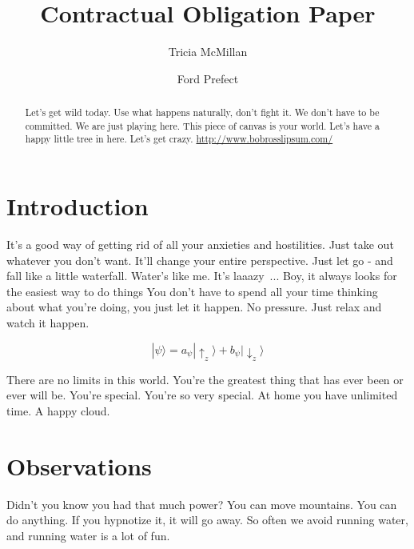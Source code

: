 \documentclass[twocolumn]{aastex63}
\begin{document}
\title{Contractual Obligation Paper}


\author{Tricia McMillan}

\author{Ford Prefect}

\begin{abstract}

Let's get wild today. Use what happens naturally, don't fight it. We
don't have to be committed. We are just playing here.
This piece of canvas is your world. Let's have a happy little tree in
here. Let's get crazy. \url{http://www.bobrosslipsum.com/}

\end{abstract}




\section{Introduction}

It's a good way of getting rid of all your anxieties and hostilities.
Just take out whatever you don't want. It'll change your entire
perspective. Just let go - and fall like a little waterfall. Water's
like me. It's laaazy ... Boy, it always looks for the easiest way to do
things You don't have to spend all your time thinking about what you're
doing, you just let it happen. No pressure. Just relax and watch it
happen.


\[
 |\psi \rangle =a_{\psi }|\uparrow _{z}\rangle +b_{\psi }|\downarrow _{z}\rangle 
\]

There are no limits in this world. You're the greatest thing that has
ever been or ever will be. You're special. You're so very special. At
home you have unlimited time. A happy cloud.

\section{Observations}

Didn't you know you had that much power? You can move mountains. You can
do anything. If you hypnotize it, it will go away. So often we avoid
running water, and running water is a lot of fun.
\end{document}
